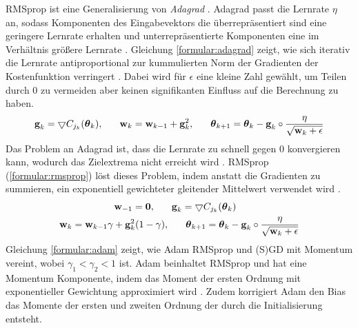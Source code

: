 \newline
RMSprop ist eine Generalisierung von \textit{Adagrad} \cite{mukkamala2017variants}.
Adagrad passt die Lernrate $\eta$ an, sodass Komponenten des Eingabevektors die überrepräsentiert sind eine geringere Lernrate erhalten und
unterrepräsentierte Komponenten eine im Verhältnis größere Lernrate \cite{duchi2011adaptive}.
Gleichung \ref{formular:adagrad} zeigt, wie sich iterativ die Lernrate antiproportional
zur kummulierten Norm der Gradienten der Kostenfunktion verringert \cite{lydia2019adagrad, kingma2014adam}.
Dabei wird für $\epsilon$ eine kleine Zahl gewählt, um Teilen durch 0 zu vermeiden aber keinen signifikanten Einfluss auf die Berechnung zu haben.
\begin{align}
    \label{formular:adagrad}
    \textbf{g}_k = \bigtriangledown C_{j_k}(\boldsymbol\theta_k), \hspace{0.6cm}
    \textbf{w}_k = \textbf{w}_{k-1} + \textbf{g}_k^2, \hspace{0.6cm}
    \boldsymbol\theta_{k+1} = \boldsymbol\theta_k - \textbf{g}_k \circ \frac{\eta}{\sqrt{\textbf{w}_k + \epsilon}}
\end{align}
Das Problem an Adagrad ist, dass die Lernrate zu schnell gegen 0 konvergieren kann, wodurch das Zielextrema nicht erreicht wird \cite{bengio2017deep}.
RMSprop \cite{hinton2012neural} (\ref{formular:rmsprop}) löst dieses Problem, indem anstatt die Gradienten zu summieren, ein
exponentiell gewichteter gleitender Mittelwert verwendet wird \cite{bengio2017deep}.
\begin{align}
    \label{formular:rmsprop}
    \textbf{w}_{-1} = \textbf{0}, \hspace{0.6cm}
    \textbf{g}_k = \bigtriangledown C_{j_k}(\boldsymbol\theta_k) \hspace{2.3cm} \nonumber\\
    \textbf{w}_k = \textbf{w}_{k-1}\gamma + \textbf{g}_k^2 (1-\gamma), \hspace{0.6cm}
    \boldsymbol\theta_{k+1} = \boldsymbol\theta_k - \textbf{g}_k \circ \frac{\eta}{\sqrt{\textbf{w}_k + \epsilon}}
\end{align}
Gleichung \ref{formular:adam} zeigt, wie Adam RMSprop und (S)GD mit Momentum vereint, wobei $\gamma_1 < \gamma_2 < 1$ \cite{kingma2014adam} ist.
Adam beinhaltet RMSprop und hat eine Momentum Komponente, indem das Moment der ersten Ordnung mit exponentieller Gewichtung approximiert wird \cite{bengio2017deep}.
Zudem korrigiert Adam den Bias das Momente der ersten und zweiten Ordnung der durch die Initialisierung entsteht.
